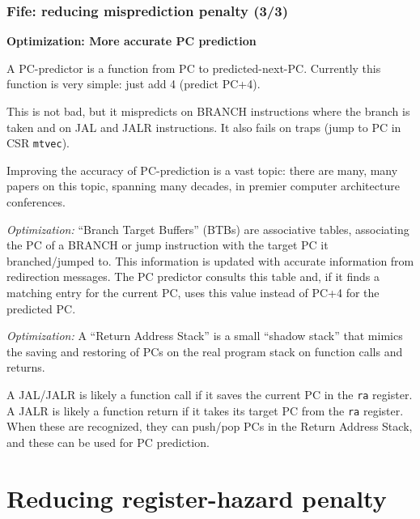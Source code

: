 \begin{frame}[fragile]
\frametitle{Fife: reducing misprediction penalty (3/3)}

\footnotesize

{\bf Optimization: More accurate PC prediction}

\vx

A PC-predictor is a function from PC to predicted-next-PC.  Currently
this function is very simple: just add 4 (predict PC+4).

\vx

This is not bad, but it mispredicts on BRANCH instructions where the
branch is taken and on JAL and JALR instructions.  It also fails on
traps (jump to PC in CSR {\tt mtvec}).

\vx

Improving the accuracy of PC-prediction is a vast topic: there are
many, many papers on this topic, spanning many decades, in premier
computer architecture conferences.

\PAUSE{\vx}

\hdivider

{\emph{Optimization:}} ``Branch Target Buffers'' (BTBs) are
associative tables, associating the PC of a BRANCH or jump instruction
with the target PC it branched/jumped to.  This information is updated
with accurate information from redirection messages.  The PC predictor
consults this table and, if it finds a matching entry for the current
PC, uses this value instead of PC+4 for the predicted PC.

\PAUSE{\vx}

\hdivider

{\emph{Optimization:}} A ``Return Address Stack'' is a small ``shadow
stack'' that mimics the saving and restoring of PCs on the real
program stack on function calls and returns.

\vx

A JAL/JALR is likely a function call if it saves the current PC in the
{\tt ra} register.  A JALR is likely a function return if it takes its
target PC from the {\tt ra} register.  When these are recognized, they
can push/pop PCs in the Return Address Stack, and these can be used
for PC prediction.

\end{frame}


\section{Reducing register-hazard penalty}

